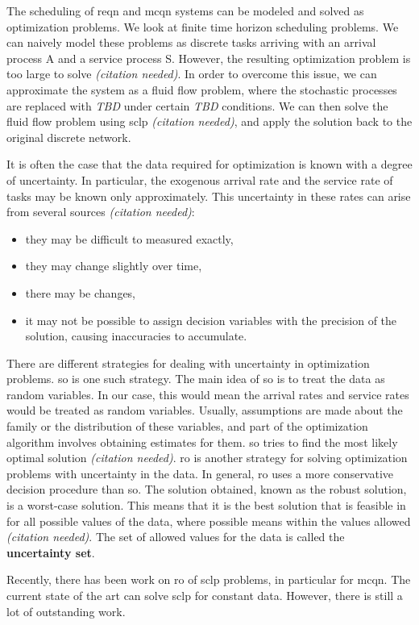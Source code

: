 \documentclass[11pt,a4paper,titlepage]{article}
\newcommand\needc{{\color{purple}\textit{(citation needed)}}}
\newcommand\tbd{{\color{orange}\textit{TBD}}}
\theoremstyle{definition}
\begin{document}
The scheduling of \gls{reqn} and \gls{mcqn} systems can be modeled and solved
as optimization problems.
We look at finite time horizon scheduling problems.
We can naively model these problems as discrete tasks arriving with an arrival
process A and a service process S.
However,
the resulting optimization problem is too large to solve \needc.
In order to overcome this issue,
we can approximate the system as a fluid flow problem,
where the stochastic processes are replaced with \tbd{}
under certain \tbd{} conditions.
We can then solve the fluid flow problem using \gls{sclp} \needc,
and apply the solution back to the original discrete network.

It is often the case that the data required for optimization is known with a
degree of uncertainty.
In particular,
the exogenous arrival rate and the service rate of tasks may be known only
approximately.
This uncertainty in these rates can arise from several sources \needc:
\begin{itemize}
    \item they may be difficult to measured exactly,
    \item they may change slightly over time,
    \item there may be changes,
    \item it may not be possible to assign decision variables with
        the precision of the solution,
        causing inaccuracies to accumulate.
\end{itemize}

There are different strategies for dealing with uncertainty in
optimization problems.
\Gls{so} is one such strategy.
The main idea of \gls{so} is to treat the data as random variables.
In our case,
this would mean the arrival rates and service rates would be treated as
random variables.
Usually,
assumptions are made about the family or the distribution of these variables,
and part of the optimization algorithm involves obtaining estimates for them.
\Gls{so} tries to find the most likely optimal solution \needc.
\Gls{ro} is another strategy for solving optimization problems with uncertainty
in the data.
In general,
\gls{ro} uses a more conservative decision procedure than \gls{so}.
The solution obtained,
known as the robust solution,
is a worst-case solution.
This means that it is the best solution that is feasible in for all possible
values of the data,
where possible means within the values allowed \needc.
The set of allowed values for the data is called the \textbf{uncertainty set}.

Recently,
there has been work on \acrlong{ro} of \gls{sclp} problems,
in particular for \gls{mcqn}.
The current state of the art can solve \gls{sclp} for constant data.
However,
there is still a lot of outstanding work.
\end{document}
